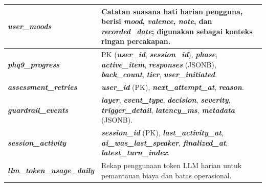\begin{longtable}{|>{\raggedright\arraybackslash}p{3.3cm}|>{\raggedright\arraybackslash}p{10cm}|}
\hline
\textbf{\textit{user\_moods}} & Catatan suasana hati harian pengguna, berisi \textbf{\textit{mood}}, \textbf{\textit{valence}}, \textbf{\textit{note}}, dan \textbf{\textit{recorded\_date}}; digunakan sebagai konteks ringan percakapan.\\
\hline
\textbf{\textit{phq9\_progress}} & PK (\textbf{\textit{user\_id}}, \textbf{\textit{session\_id}}), \textbf{\textit{phase}}, \textbf{\textit{active\_item}}, \textbf{\textit{responses}} (JSONB), \textbf{\textit{back\_count}}, \textbf{\textit{tier}}, \textbf{\textit{user\_initiated}}.\\
\hline
\textbf{\textit{assessment\_retries}} & \textbf{\textit{user\_id}} (PK), \textbf{\textit{next\_attempt\_at}}, \textbf{\textit{reason}}.\\
\hline
\textbf{\textit{guardrail\_events}} & \textbf{\textit{layer}}, \textbf{\textit{event\_type}}, \textbf{\textit{decision}}, \textbf{\textit{severity}}, \textbf{\textit{trigger\_detail}}, \textbf{\textit{latency\_ms}}, \textbf{\textit{metadata}} (JSONB).\\
\hline
\textbf{\textit{session\_activity}} & \textbf{\textit{session\_id}} (PK), \textbf{\textit{last\_activity\_at}}, \textbf{\textit{ai\_was\_last\_speaker}}, \textbf{\textit{finalized\_at}}, \textbf{\textit{latest\_turn\_index}}.\\
\hline
\textbf{\textit{llm\_token\_usage\_daily}} & Rekap penggunaan token LLM harian untuk pemantauan biaya dan batas operasional.\\
\end{longtable}
\endgroup


